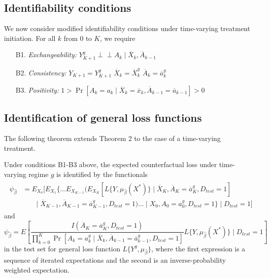 \subsection{Identifiability conditions}
We now consider modified identifiability conditions under time-varying treatment initiation. For all $k$ from 0 to $K$, we require
\begin{enumerate}
    \item[B1.] \textit{Exchangeability:} $Y^g_{K+1} \perp \!\!\! \perp A_k \mid \overline{X}_k, \overline{A}_{k-1}$
    \item[B2.] \textit{Consistency:} $Y_{K+1} = Y^g_{K+1}$ $\overline{X}_{k} = \overline{X}^g_{k}$  $\overline{A}_k = \overline{a}_k^g$
    \item[B3.] \textit{Positivity:} $1 > \Pr[A_k = a_k \mid \overline{X}_k = \overline{x}_k, \overline{A}_{k -1} = \overline{a}_{k-1}] > 0$
\end{enumerate}

\subsection{Identification of general loss functions}
The following theorem extends Theorem 2 to the case of a time-varying treatment. 
\begin{theorem}
    Under conditions B1-B3 above, the expected counterfactual loss under time-varying regime $g$ is identified by the functionals
    \begin{align}\label{eqn:cl_tv_estimand}
    \begin{split}
        \psi_{\widehat{\beta}} &= E_{X_0}\bigg[E_{X_1}\bigg\{\ldots E_{X_{K-1}}\bigg(E_{X_{K}}[L\{Y, \mu_{\widehat{\beta}}(X^*)\} \mid \overline{X}_K, \overline{A}_K=\overline{a}^g_K, D_{test} = 1] \\
        & \qquad \big\vert\; \overline{X}_{K-1}, \overline{A}_{K-1}=\overline{a}^g_{K-1}, D_{test} = 1\bigg) \ldots \;\big\vert\; X_{0}, A_{0}=a^g_{0}, D_{test} = 1\bigg\}\;\big\vert\; D_{test} = 1\bigg]
    \end{split}
    \end{align}
and 
    \begin{equation}\label{eqn:ipw_tv_estimand}
        \psi_{\widehat{\beta}} = E\left[\frac{I(\overline{A}_K = \overline{a}^g_K, D_{test} = 1)}{\prod_{k=0}^K\Pr[A_k = a^g_k \mid \overline{X}_k, \overline{A}_{k-1} = \overline{a}^g_{k-1}, D_{test} = 1]}L\{Y, \mu_{\widehat{\beta}}(X^*)\} \mid D_{test} = 1\right]
    \end{equation}
in the test set for general loss function $L\{Y^{g}, \mu_{\widehat{\beta}}\}$, where the first expression is a sequence of iterated expectations and the second is an inverse-probability weighted expectation.
\end{theorem}

